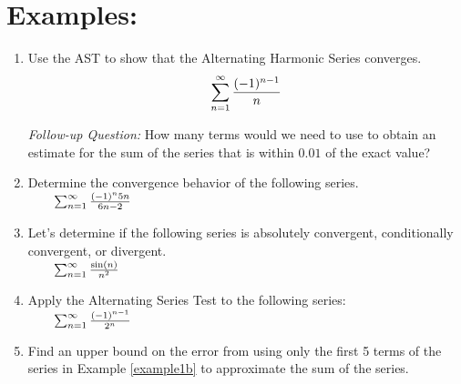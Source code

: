 \documentclass[10pt]{article}
\begin{document}


\section*{Examples:}
\begin{enumerate}[{Example} 1:]



\item Use the AST to show that the Alternating Harmonic Series converges.
\[\sum_{n=1}^\infty \frac{(-1)^{n-1}}{n}\]

\vfill

\hspace*{-.75in} \textit{Follow-up Question:} How many terms would we need to use to obtain an estimate for the sum of the series that is within \(0.01\) of the exact value?

\pagebreak

\item Determine the convergence behavior of the following series.\\
\( \qquad
\sum_{n=1}^\infty \frac{(-1)^n 5n}{6n-2}
\)


\vfill

\item Let's determine if the following series is absolutely convergent, conditionally convergent, or divergent.\\%
\(\qquad\sum_{n=1}^\infty \frac{\sin(n)}{n^2}\) %


\vfill

\item Apply the Alternating Series Test to the following series:\\
\( \qquad  \sum_{n=1}^\infty	\frac{(-1)^{n-1}}{2^{n}}\)\label{example1b}
\vfill

\item Find an upper bound on the error from using only the first 5 terms of the series in Example \ref{example1b} to approximate the sum of the series. 

\vfill




\end{enumerate}
\end{document}
